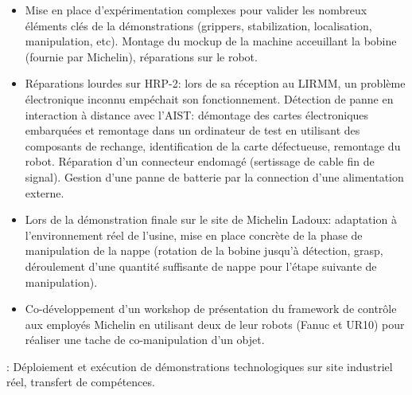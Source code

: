 \begin{cventries}
{\begin{cvitems}
\begin{itemize}
        \item Mise en place d'expérimentation complexes pour valider les nombreux éléments clés de la
          démonstrations (grippers, stabilization, localisation, manipulation, etc). Montage du mockup de la
          machine acceuillant la bobine (fournie par Michelin), réparations sur le robot.
        \item Réparations lourdes sur HRP-2: lors de sa réception au LIRMM, un problème électronique inconnu
          empéchait son fonctionnement. Détection de panne en interaction à distance avec l'AIST: démontage
          des cartes électroniques embarquées et remontage dans un ordinateur de test en utilisant des
          composants de rechange, identification de la carte défectueuse, remontage du robot. Réparation d'un
          connecteur endomagé (sertissage de cable fin de signal). Gestion d'une panne de batterie par la
          connection d'une alimentation externe.
        \item Lors de la démonstration finale sur le site de Michelin Ladoux: adaptation à l'environnement
          réel de l'usine, mise en place concrète de la phase de manipulation de la nappe (rotation de la
            bobine jusqu'à détection, grasp, déroulement d'une quantité suffisante de nappe pour l'étape
          suivante de manipulation).
        \item Co-développement d'un workshop de présentation du framework de contrôle aux employés Michelin
          en utilisant deux de leur robots (Fanuc et UR10) pour réaliser une tache de co-manipulation d'un objet.
      \end{itemize}
    \item {} : Déploiement et exécution de démonstrations technologiques sur site
      industriel réel, transfert de compétences.
    \end{cvitems}
  }


\end{cventries}
